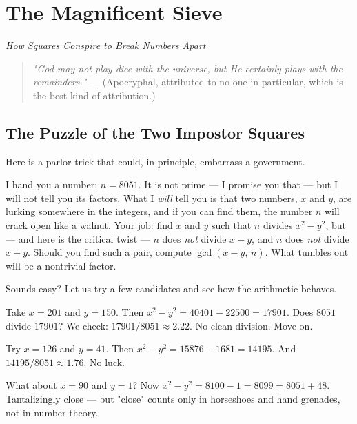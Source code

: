 \chapter{The Magnificent Sieve}



\begin{center}\textit{How Squares Conspire to Break Numbers Apart}\end{center}
\bigskip


\ornbreak


\begin{quote}
\textit{"God may not play dice with the universe, but He certainly plays with the remainders."}
--- (Apocryphal, attributed to no one in particular, which is the best kind of attribution.)
\end{quote}


\ornbreak



\section{The Puzzle of the Two Impostor Squares}


Here is a parlor trick that could, in principle, embarrass a government.

I hand you a number: $n = 8051$. It is not prime --- I promise you that --- but I will not tell you its factors. What I \textit{will} tell you is that two numbers, $x$ and $y$, are lurking somewhere in the integers, and if you can find them, the number $n$ will crack open like a walnut. Your job: find $x$ and $y$ such that $n$ divides $x^2 - y^2$, but --- and here is the critical twist --- $n$ does \textit{not} divide $x - y$, and $n$ does \textit{not} divide $x + y$. Should you find such a pair, compute $\gcd(x - y, \, n)$. What tumbles out will be a nontrivial factor.

Sounds easy? Let us try a few candidates and see how the arithmetic behaves.

Take $x = 201$ and $y = 150$. Then $x^2 - y^2 = 40401 - 22500 = 17901$. Does $8051$ divide $17901$? We check: $17901 / 8051 \approx 2.22$. No clean division. Move on.

Try $x = 126$ and $y = 41$. Then $x^2 - y^2 = 15876 - 1681 = 14195$. And $14195 / 8051 \approx 1.76$. No luck.

What about $x = 90$ and $y = 1$? Now $x^2 - y^2 = 8100 - 1 = 8099 = 8051 + 48$. Tantalizingly close --- but "close" counts only in horseshoes and hand grenades, not in number theory.

